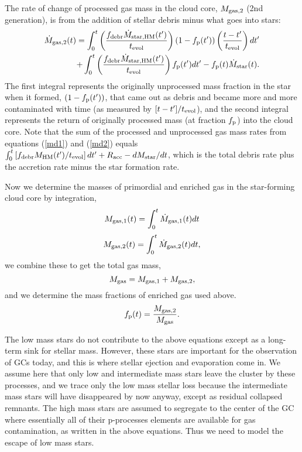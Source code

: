 \documentclass[12pt,preprint]{aastex}
\begin{document}
The rate of change of processed gas mass in the cloud core, $M_{\rm gas,2}$ (2nd
generation), is from the addition of stellar debris minus what goes into stars:
\begin{eqnarray}\label{md2}
{\dot M}_{\rm gas,2}(t)=\int_0^t \left({{f_{\rm debr}{\dot M}_{\rm star,HM}(t^\prime)}\over{t_{\rm evol}}}
\right)\left(1-f_{\rm p}(t^\prime)\right)\left({{t-t^\prime}\over{t_{\rm evol}}}\right)dt^\prime\\
\nonumber
+\int_0^t \left({{f_{\rm debr}{\dot M}_{\rm star,HM}(t^\prime)}\over{t_{\rm evol}}}
\right)f_{\rm p}(t^\prime) dt^\prime -f_{\rm p}(t){\dot M}_{\rm star}(t).
\end{eqnarray}
The first integral represents the originally unprocessed mass fraction in the star
when it formed, $(1-f_{\rm p}(t^\prime))$, that came out as debris and became more
and more contaminated with time (as measured by $[t-t^\prime]/t_{\rm evol}$), and
the second integral represents the return of originally processed mass (at fraction
$f_{\rm p}$) into the cloud core. Note that the sum of the processed and
unprocessed gas mass rates from equations (\ref{md1}) and (\ref{md2}) equals
$\int_0^t \left[f_{\rm debr}M_{\rm HM}(t^\prime)/t_{\rm
evol}\right]dt^\prime+R_{\rm acc}-dM_{\rm star}/dt$, which is the total debris rate
plus the accretion rate minus the star formation rate.

Now we determine the masses of primordial and enriched gas in the star-forming
cloud core by integration,
\begin{equation}
M_{\rm gas,1}(t)=\int_0^t {\dot M}_{\rm gas,1}(t)dt
\end{equation}
\begin{equation}
M_{\rm gas,2}(t)=\int_0^t {\dot M}_{\rm gas,2}(t)dt,
\end{equation}
we combine these to get the total gas mass,
\begin{equation}
M_{\rm gas}=M_{\rm gas,1}+M_{\rm gas,2},
\end{equation}
and we determine the mass fractions of enriched gas used above.
\begin{equation}
f_{\rm p}(t)={{M_{\rm gas,2}}\over{M_{\rm gas}}}.
\label{fp}
\end{equation}

The low mass stars do not contribute to the above equations except as a long-term
sink for stellar mass.  However, these stars are important for the observation of
GCs today, and this is where stellar ejection and evaporation come in. We assume
here that only low and intermediate mass stars leave the cluster by these
processes, and we trace only the low mass stellar loss because the intermediate
mass stars will have disappeared by now anyway, except as residual collapsed
remnants. The high mass stars are assumed to segregate to the center of the GC
where essentially all of their p-processes elements are available for gas
contamination, as written in the above equations.  Thus we need to model the escape
of low mass stars.
\end{document}
